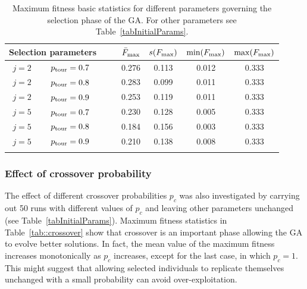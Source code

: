 \documentclass[12pt,titlepage]{article}
\begin{document}
\begin{table}[H]
\centering
\begin{tabular}{ccc|cccc}
\toprule
\multicolumn{2}{c}{Selection parameters} & $\quad$ & $\bar{F}_{\textup{max}}$ & $s(F_{\textup{max}})$ & $\min(F_{\textup{max}})$ & $\max(F_{\textup{max}})$ \\
\midrule
$ j = 2$ & $p_{\textup{tour}} = 0.7 $ & & 0.276 & 0.113 & 0.012 & 0.333 \\
$ j = 2$ & $p_{\textup{tour}} = 0.8 $ & & 
0.283 & 0.099 & 0.011 & 0.333 \\
$ j = 2$ & $p_{\textup{tour}} = 0.9 $ & & 0.253 & 0.119 & 0.011 & 0.333 \\
$ j = 5$ & $p_{\textup{tour}} = 0.7 $ & & 0.230 & 0.128 & 0.005 & 0.333 \\
$ j = 5$ & $p_{\textup{tour}} = 0.8 $ & & 0.184 & 0.156 & 0.003 & 0.333 \\
$ j = 5$ & $p_{\textup{tour}} = 0.9 $ & & 0.210 & 0.138 & 0.008 & 0.333 \\
\bottomrule
\caption{Maximum fitness basic statistics for different parameters governing the selection phase of the GA. For other parameters see Table~\ref{tabInitialParams}.}
\label{tab::selection}
\end{tabular}
\end{table}

\subsubsection*{Effect of crossover probability}
The effect of different crossover probabilities $p_c$ was also investigated by carrying out 50 runs with different values of $p_c$ and leaving other parameters unchanged (see Table~\ref{tabInitialParams}). Maximum fitness statistics in Table~\ref{tab::crossover} show that crossover is an important phase allowing the GA to evolve better solutions. In fact, the mean value of the maximum fitness increases monotonically as $p_c$ increases, except for the last case, in which $p_c = 1$. This might suggest that allowing selected individuals to replicate themselves unchanged with a small probability can avoid over-exploitation.
\end{document}
